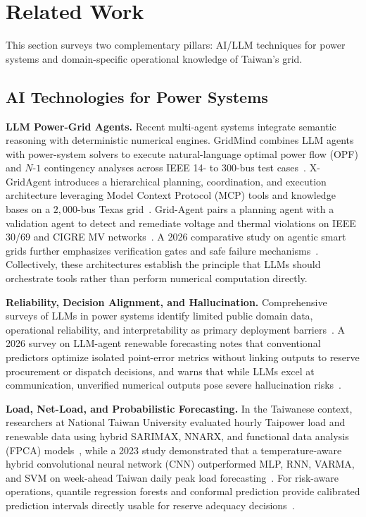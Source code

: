 \documentclass[conference]{IEEEtran}
\begin{document}
\section{Related Work}
\label{sec:related_work}

This section surveys two complementary pillars: AI/LLM techniques for power systems and domain-specific operational knowledge of Taiwan's grid.

\subsection{AI Technologies for Power Systems}
\label{sec:related_ai}

\textbf{LLM Power-Grid Agents.} Recent multi-agent systems integrate semantic reasoning with deterministic numerical engines. GridMind combines LLM agents with power-system solvers to execute natural-language optimal power flow (OPF) and $N\text{-}1$ contingency analyses across IEEE 14- to 300-bus test cases~\cite{ref20}. X-GridAgent introduces a hierarchical planning, coordination, and execution architecture leveraging Model Context Protocol (MCP) tools and knowledge bases on a $2{,}000$-bus Texas grid~\cite{ref21}. Grid-Agent pairs a planning agent with a validation agent to detect and remediate voltage and thermal violations on IEEE 30/69 and CIGRE MV networks~\cite{ref22}. A 2026 comparative study on agentic smart grids further emphasizes verification gates and safe failure mechanisms~\cite{ref25}. Collectively, these architectures establish the principle that LLMs should orchestrate tools rather than perform numerical computation directly.

\textbf{Reliability, Decision Alignment, and Hallucination.} Comprehensive surveys of LLMs in power systems identify limited public domain data, operational reliability, and interpretability as primary deployment barriers~\cite{ref23}. A 2026 survey on LLM-agent renewable forecasting notes that conventional predictors optimize isolated point-error metrics without linking outputs to reserve procurement or dispatch decisions, and warns that while LLMs excel at communication, unverified numerical outputs pose severe hallucination risks~\cite{ref24}.

\textbf{Load, Net-Load, and Probabilistic Forecasting.} In the Taiwanese context, researchers at National Taiwan University evaluated hourly Taipower load and renewable data using hybrid SARIMAX, NNARX, and functional data analysis (FPCA) models~\cite{ref26}, while a 2023 study demonstrated that a temperature-aware hybrid convolutional neural network (CNN) outperformed MLP, RNN, VARMA, and SVM on week-ahead Taiwan daily peak load forecasting~\cite{ref27}. For risk-aware operations, quantile regression forests and conformal prediction provide calibrated prediction intervals directly usable for reserve adequacy decisions~\cite{ref24}.
\end{document}
